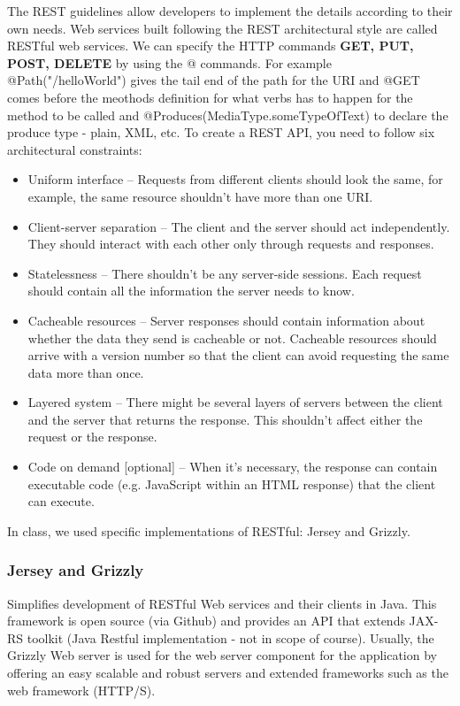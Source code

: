 \documentclass[a4paper, 11pt]{article}
\begin{document}
        \newpage\newpage
        The REST guidelines allow developers to implement the details according to their own needs. Web services built following the REST architectural style are called RESTful web services.  We can specify the HTTP commands \textbf{GET, PUT, POST, DELETE} by using the @ commands. For example @Path("/helloWorld") gives the tail end of the path for the URI and @GET comes before the meothods definition for what verbs has to happen for the method to be called and @Produces(MediaType.someTypeOfText) to declare the produce type - plain, XML, etc.  To create a REST API, you need to follow six architectural constraints:
        \begin{itemize}
            \item Uniform interface – Requests from different clients should look the same, for example, the same resource shouldn’t have more than one URI.
            \item Client-server separation – The client and the server should act independently. They should interact with each other only through requests and responses.
            \item Statelessness – There shouldn’t be any server-side sessions. Each request should contain all the information the server needs to know.
            \item Cacheable resources – Server responses should contain information about whether the data they send is cacheable or not. Cacheable resources should arrive with a version number so that the client can avoid requesting the same data more than once.
            \item Layered system – There might be several layers of servers between the client and the server that returns the response. This shouldn’t affect either the request or the response.
            \item Code on demand [optional] – When it’s necessary, the response can contain executable code (e.g. JavaScript within an HTML response) that the client can execute.
        \end{itemize}
        In class, we used specific implementations of RESTful: Jersey and Grizzly.

        \subsubsection{Jersey and Grizzly}
            Simplifies development of RESTful Web services and their clients in Java.  This framework is open source (via Github) and provides an API that extends JAX-RS toolkit (Java Restful implementation - not in scope of course).  Usually, the Grizzly Web server is used for the web server component for the application by offering an easy scalable and robust servers and extended frameworks such as the web framework (HTTP/S).
\end{document}
